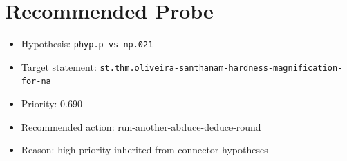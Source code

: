 \documentclass[11pt]{article}
\begin{document}
\section{Recommended Probe}
\begin{itemize}[leftmargin=*,itemsep=0.25em]
\item Hypothesis: \texttt{phyp.p-vs-np.021}
\item Target statement: \texttt{st.thm.oliveira-santhanam-hardness-magnification-for-na}
\item Priority: 0.690
\item Recommended action: run-another-abduce-deduce-round
\item Reason: high priority inherited from connector hypotheses
\end{itemize}
\end{document}
